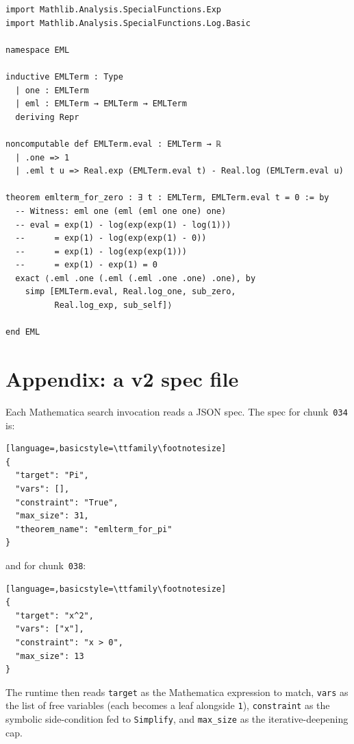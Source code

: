 \documentclass[11pt,a4paper]{article}
\theoremstyle{plain}
\theoremstyle{definition}
\begin{document}
\begin{lstlisting}
import Mathlib.Analysis.SpecialFunctions.Exp
import Mathlib.Analysis.SpecialFunctions.Log.Basic

namespace EML

inductive EMLTerm : Type
  | one : EMLTerm
  | eml : EMLTerm → EMLTerm → EMLTerm
  deriving Repr

noncomputable def EMLTerm.eval : EMLTerm → ℝ
  | .one => 1
  | .eml t u => Real.exp (EMLTerm.eval t) - Real.log (EMLTerm.eval u)

theorem emlterm_for_zero : ∃ t : EMLTerm, EMLTerm.eval t = 0 := by
  -- Witness: eml one (eml (eml one one) one)
  -- eval = exp(1) - log(exp(exp(1) - log(1)))
  --      = exp(1) - log(exp(exp(1) - 0))
  --      = exp(1) - log(exp(exp(1)))
  --      = exp(1) - exp(1) = 0
  exact ⟨.eml .one (.eml (.eml .one .one) .one), by
    simp [EMLTerm.eval, Real.log_one, sub_zero,
          Real.log_exp, sub_self]⟩

end EML
\end{lstlisting}

\section{Appendix: a v2 spec file}\label{app:spec}

Each Mathematica search invocation reads a JSON spec.  The spec for
chunk~\texttt{034} is:

\begin{lstlisting}[language=,basicstyle=\ttfamily\footnotesize]
{
  "target": "Pi",
  "vars": [],
  "constraint": "True",
  "max_size": 31,
  "theorem_name": "emlterm_for_pi"
}
\end{lstlisting}

\noindent and for chunk~\texttt{038}:

\begin{lstlisting}[language=,basicstyle=\ttfamily\footnotesize]
{
  "target": "x^2",
  "vars": ["x"],
  "constraint": "x > 0",
  "max_size": 13
}
\end{lstlisting}

The runtime then reads \texttt{target} as the Mathematica expression to
match, \texttt{vars} as the list of free variables (each becomes a
leaf alongside \texttt{1}), \texttt{constraint} as the symbolic
side-condition fed to \texttt{Simplify}, and \texttt{max\_size} as the
iterative-deepening cap.

\end{document}
